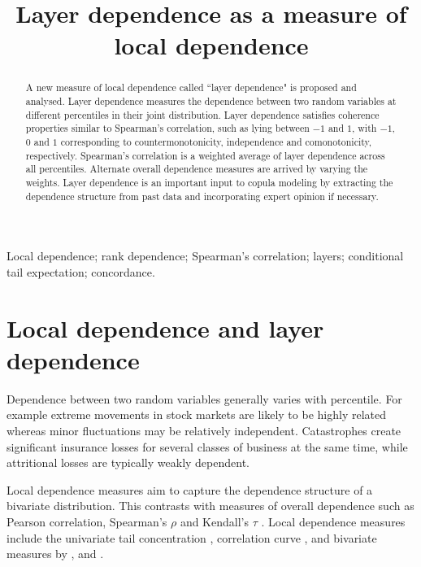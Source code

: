 \documentclass[authoryear]{elsarticle}
\begin{document}
\begin{frontmatter}



\title{Layer dependence as a measure of local dependence}



\begin{abstract}
A new measure of local dependence called  ``layer dependence" is proposed and analysed. Layer dependence measures the dependence between two random variables at different percentiles in their joint distribution. Layer dependence satisfies coherence properties similar to Spearman's correlation, such as lying between $-1$ and $1$, with $-1$, $0$ and $1$ corresponding to countermonotonicity, independence and comonotonicity, respectively. Spearman's correlation is  a weighted average of layer dependence across all percentiles.  Alternate overall dependence measures are arrived by varying the weights. Layer dependence is an important input to copula modeling by extracting the dependence structure from past data and incorporating expert opinion if necessary.
\end{abstract}

\begin{keyword}
Local dependence; rank dependence; Spearman's correlation; layers; conditional tail expectation; concordance.
\end{keyword}



\end{frontmatter}




\section{Local dependence and layer dependence}\label{sreview}


Dependence between two random variables generally varies with percentile. For example extreme movements in  stock markets are likely to be highly related  whereas minor fluctuations may be relatively independent.  Catastrophes create significant insurance losses for several classes of business at the same time, while attritional losses are typically weakly dependent.

Local dependence measures aim to capture the dependence structure of a bivariate distribution. This contrasts with  measures of overall dependence such as Pearson correlation, Spearman's $\rho$ and Kendall's $\tau$ \citep{embrechts2002correlation}. Local dependence measures include the univariate tail concentration \citep{venter2002tails}, correlation curve \citep{bjerve1993correlation}, and bivariate measures by \cite{bairamov2003new}, \cite{jones1996local} and \cite{holland1987dependence}.
\end{document}
